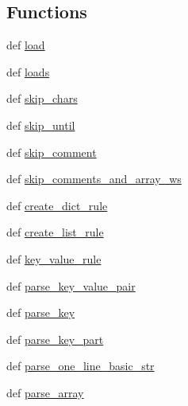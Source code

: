 \subsection*{Functions}
\begin{DoxyCompactItemize}
\item 
def \hyperlink{namespacepip_1_1__vendor_1_1tomli_1_1__parser_a298b7fd7d6e5e7d71a3bccfdf50f049b}{load}
\item 
def \hyperlink{namespacepip_1_1__vendor_1_1tomli_1_1__parser_acf493046c185aaa14d91ddc987346c94}{loads}
\item 
def \hyperlink{namespacepip_1_1__vendor_1_1tomli_1_1__parser_a8d16dba4889f3656740d80b4c8fc79d0}{skip\+\_\+chars}
\item 
def \hyperlink{namespacepip_1_1__vendor_1_1tomli_1_1__parser_a70ec0b61b8e39251419f242faa77d5b6}{skip\+\_\+until}
\item 
def \hyperlink{namespacepip_1_1__vendor_1_1tomli_1_1__parser_aab6bb6af4c64fd7cf1d599511792972b}{skip\+\_\+comment}
\item 
def \hyperlink{namespacepip_1_1__vendor_1_1tomli_1_1__parser_a22904f6eb21cae5de44991105baaceab}{skip\+\_\+comments\+\_\+and\+\_\+array\+\_\+ws}
\item 
def \hyperlink{namespacepip_1_1__vendor_1_1tomli_1_1__parser_a85a76edd7c7cbd56143407f395089f57}{create\+\_\+dict\+\_\+rule}
\item 
def \hyperlink{namespacepip_1_1__vendor_1_1tomli_1_1__parser_a1ff313a6df15e71f01d57101a95f9ca8}{create\+\_\+list\+\_\+rule}
\item 
def \hyperlink{namespacepip_1_1__vendor_1_1tomli_1_1__parser_aad4fd838b9262a4cbff7f3f50a9350cd}{key\+\_\+value\+\_\+rule}
\item 
def \hyperlink{namespacepip_1_1__vendor_1_1tomli_1_1__parser_a93fab8843d303c81ec33244bc950d7b5}{parse\+\_\+key\+\_\+value\+\_\+pair}
\item 
def \hyperlink{namespacepip_1_1__vendor_1_1tomli_1_1__parser_a003da3b00b89f3ed79ed43c6fd6b5310}{parse\+\_\+key}
\item 
def \hyperlink{namespacepip_1_1__vendor_1_1tomli_1_1__parser_aebf745769c818aae5e83e0692f19e3a2}{parse\+\_\+key\+\_\+part}
\item 
def \hyperlink{namespacepip_1_1__vendor_1_1tomli_1_1__parser_a314fdc3794b9cfc71ff0bde06009cd3a}{parse\+\_\+one\+\_\+line\+\_\+basic\+\_\+str}
\item 
def \hyperlink{namespacepip_1_1__vendor_1_1tomli_1_1__parser_a5204f286ea9dff461466956570222569}{parse\+\_\+array}
\item 

\end{DoxyCompactItemize}
